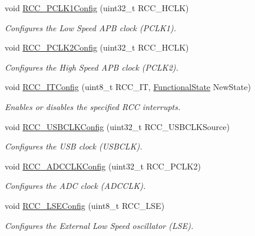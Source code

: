 \begin{DoxyCompactItemize}
void \mbox{\hyperlink{group___r_c_c___exported___functions_ga448137346d4292985d4e7a61dd1a824f}{R\+C\+C\+\_\+\+P\+C\+L\+K1\+Config}} (uint32\+\_\+t R\+C\+C\+\_\+\+H\+C\+LK)
\begin{DoxyCompactList}\small\item\em Configures the Low Speed A\+PB clock (P\+C\+L\+K1). \end{DoxyCompactList}\item 
void \mbox{\hyperlink{group___r_c_c___exported___functions_ga09f9c010a4adca9e036da42c2ca6126a}{R\+C\+C\+\_\+\+P\+C\+L\+K2\+Config}} (uint32\+\_\+t R\+C\+C\+\_\+\+H\+C\+LK)
\begin{DoxyCompactList}\small\item\em Configures the High Speed A\+PB clock (P\+C\+L\+K2). \end{DoxyCompactList}\item 
void \mbox{\hyperlink{group___r_c_c___exported___functions_gaa953aa226e9ce45300d535941e4dfe2f}{R\+C\+C\+\_\+\+I\+T\+Config}} (uint8\+\_\+t R\+C\+C\+\_\+\+IT, \mbox{\hyperlink{group___exported__types_gac9a7e9a35d2513ec15c3b537aaa4fba1}{Functional\+State}} New\+State)
\begin{DoxyCompactList}\small\item\em Enables or disables the specified R\+CC interrupts. \end{DoxyCompactList}\item 
void \mbox{\hyperlink{group___r_c_c___exported___functions_ga895b3ff3d143c990f1cd0146aa260081}{R\+C\+C\+\_\+\+U\+S\+B\+C\+L\+K\+Config}} (uint32\+\_\+t R\+C\+C\+\_\+\+U\+S\+B\+C\+L\+K\+Source)
\begin{DoxyCompactList}\small\item\em Configures the U\+SB clock (U\+S\+B\+C\+LK). \end{DoxyCompactList}\item 
void \mbox{\hyperlink{group___r_c_c___exported___functions_gadda89cdb838bf49e5fa10f3f774530a4}{R\+C\+C\+\_\+\+A\+D\+C\+C\+L\+K\+Config}} (uint32\+\_\+t R\+C\+C\+\_\+\+P\+C\+L\+K2)
\begin{DoxyCompactList}\small\item\em Configures the A\+DC clock (A\+D\+C\+C\+LK). \end{DoxyCompactList}\item 
void \mbox{\hyperlink{group___r_c_c___exported___functions_ga65209ab5c3589b249c7d70f978735ca6}{R\+C\+C\+\_\+\+L\+S\+E\+Config}} (uint8\+\_\+t R\+C\+C\+\_\+\+L\+SE)
\begin{DoxyCompactList}\small\item\em Configures the External Low Speed oscillator (L\+SE). \end{DoxyCompactList}\item 

\end{DoxyCompactItemize}
